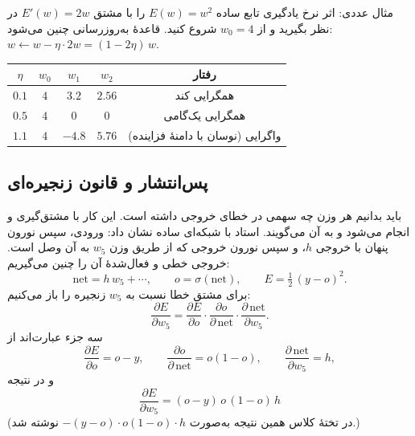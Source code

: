
\begin{addedbox}{مثال عددی: اثر نرخ یادگیری}
تابع ساده $E(w)=w^2$ را با مشتق $E'(w)=2w$ در نظر بگیرید و از $w_0=4$ شروع کنید. قاعدهٔ به‌روزرسانی چنین می‌شود: $w\leftarrow w-\eta\cdot 2w=(1-2\eta)\,w$.
\begin{center}
\begin{tabular}{c c c c c}
\toprule
$\eta$ & $w_0$ & $w_1$ & $w_2$ & رفتار \\
\midrule
$0.1$ & $4$ & $3.2$ & $2.56$ & همگرایی کند \\
$0.5$ & $4$ & $0$ & $0$ & همگرایی یک‌گامی \\
$1.1$ & $4$ & $-4.8$ & $5.76$ & واگرایی (نوسان با دامنهٔ فزاینده) \\
\bottomrule
\end{tabular}
\end{center}
\end{addedbox}

\subsection{پس‌انتشار و قانون زنجیره‌ای}
باید بدانیم هر وزن چه سهمی در خطای خروجی داشته است. این کار با مشتق‌گیری و  انجام می‌شود و به آن  می‌گویند. استاد با شبکه‌ای ساده نشان داد: ورودی، سپس نورون پنهان با خروجی $h$، و سپس نورون خروجی که از طریق وزن $w_5$ به آن وصل است. خروجی خطی و فعال‌شدهٔ آن را چنین می‌گیریم:
\[
\text{net}=h\,w_5+\cdots,\qquad o=\sigma(\text{net}),\qquad E=\tfrac12\,(y-o)^2 .
\]
برای مشتق خطا نسبت به $w_5$ زنجیره را باز می‌کنیم:
\[
\frac{\partial E}{\partial w_5}=\frac{\partial E}{\partial o}\cdot\frac{\partial o}{\partial\,\text{net}}\cdot\frac{\partial\,\text{net}}{\partial w_5}.
\]
سه جزء عبارت‌اند از
\[
\frac{\partial E}{\partial o}=o-y,\qquad
\frac{\partial o}{\partial\,\text{net}}=o(1-o),\qquad
\frac{\partial\,\text{net}}{\partial w_5}=h,
\]
و در نتیجه
\[
\boxed{\;\frac{\partial E}{\partial w_5}=(o-y)\,o\,(1-o)\,h\;}
\]
(در تختهٔ کلاس همین نتیجه به‌صورت $-(y-o)\cdot o(1-o)\cdot h$ نوشته شد.)


